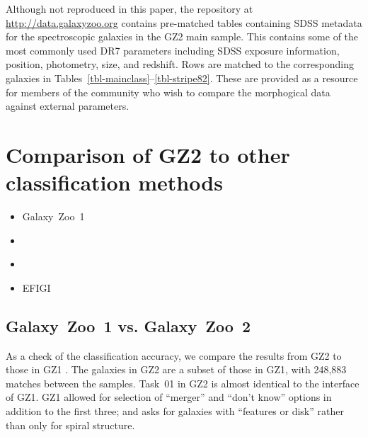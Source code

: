 \documentclass[useAMS,usenatbib]{mn2e}
\begin{document}
Although not reproduced in this paper, the repository at \url{http://data.galaxyzoo.org} contains pre-matched tables containing SDSS metadata for the spectroscopic galaxies in the GZ2 main sample. This contains some of the most commonly used DR7 parameters including SDSS exposure information, position, photometry, size, and redshift. Rows are matched to the corresponding galaxies in Tables~\ref{tbl-mainclass}--\ref{tbl-stripe82}. These are provided as a resource for members of the community who wish to compare the morphogical data against external parameters. 


\section{Comparison of GZ2 to other classification methods}\label{sec-comparison}

\begin{itemize}
	\item Galaxy~Zoo~1 \citep{lin11}
	\item \citet{nai10}
	\item \citet{hue11}
	\item EFIGI \citep{bai11}
\end{itemize}


\subsection{Galaxy~Zoo~1 vs. Galaxy~Zoo~2}

As a check of the classification accuracy, we compare the results from GZ2 to those in GZ1 \citep{lin11}. The galaxies in GZ2 are a subset of those in GZ1, with 248,883 matches between the samples. Task~01 in GZ2 is almost identical to the interface of GZ1. GZ1 allowed for selection of ``merger'' and ``don't know'' options in addition to the first three; and asks for galaxies with ``features or disk'' rather than only for spiral structure. 
\end{document}
